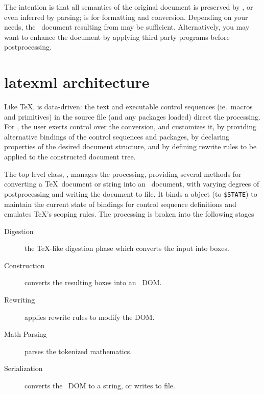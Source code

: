 \documentclass{book}
\newcommand{\ltxcode}{\lstinline[style=inlinelatexml]}
\begin{document}
The intention is that all semantics of the original document is
preserved by , or even inferred by parsing;
 is for formatting and conversion.
Depending on your needs, the \LaTeXML\ document resulting from  may be
sufficient. Alternatively, you may want to enhance the document
by applying third party programs before postprocessing.

\section{latexml architecture}\label{architecture.latexml}
%
Like \TeX,  is data-driven: the text and executable control
sequences (ie.~macros and primitives)
in the source file (and any packages loaded) direct the processing.
For \LaTeXML, the user exerts control over the conversion, and customizes it, by 
providing alternative bindings of the control sequences and packages,
by declaring properties of the desired document structure,
and by defining rewrite rules to be applied to the constructed document tree.

The top-level class, , manages the processing, providing several methods
for converting a \TeX\ document or string into an \XML\ document, with varying degrees
of postprocessing and writing the document to file.
It binds a  object (to \ltxcode|$STATE|)%
to maintain the current state
of bindings for control sequence definitions and emulates \TeX's scoping rules.
The processing is broken into the following stages
\begin{description}
   \item[Digestion] the \TeX-like digestion phase which converts the input into boxes.
   \item[Construction] converts the resulting boxes into an \XML\ DOM.
   \item[Rewriting] applies rewrite rules to modify the DOM.
   \item[Math Parsing] parses the tokenized mathematics.
   \item[Serialization] converts the \XML\ DOM to a string, or writes to file.
\end{description}

\end{document}
